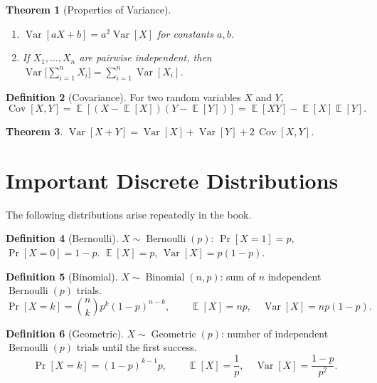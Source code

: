 \documentclass[twoside,12pt]{book}
\theoremstyle{plain}
\newtheorem{theorem}{Theorem}[chapter]
\theoremstyle{definition}
\newtheorem{definition}[theorem]{Definition}
\theoremstyle{remark}
\newcommand{\Exp}{\operatorname{\mathbb{E}}}
\newcommand{\Var}{\operatorname{Var}}
\newcommand{\Cov}{\operatorname{Cov}}
\begin{document}
\begin{theorem}[Properties of Variance]
\begin{enumerate}
\item $\Var[aX + b] = a^2 \Var[X]$ for constants $a, b$.
\item If $X_1, \ldots, X_n$ are \emph{pairwise independent}, then
      $\Var\bigl[\sum_{i=1}^{n} X_i\bigr] = \sum_{i=1}^{n} \Var[X_i]$.
\end{enumerate}
\end{theorem}

\begin{definition}[Covariance]
For two random variables $X$ and $Y$,
\[
\Cov[X, Y] = \Exp[(X - \Exp[X])(Y - \Exp[Y])]
            = \Exp[XY] - \Exp[X]\Exp[Y].
\]
\end{definition}

\begin{theorem}
$\Var[X + Y] = \Var[X] + \Var[Y] + 2\,\Cov[X, Y]$.
\end{theorem}

\section{Important Discrete Distributions}
\label{app:sec:distributions}

The following distributions arise repeatedly in the book.

\begin{definition}[Bernoulli]
$X \sim \operatorname{Bernoulli}(p)$: $\Pr[X = 1] = p$,
$\Pr[X = 0] = 1-p$. $\Exp[X] = p$, $\Var[X] = p(1-p)$.
\end{definition}

\begin{definition}[Binomial]
$X \sim \operatorname{Binomial}(n, p)$: sum of $n$ independent
$\operatorname{Bernoulli}(p)$ trials.
\[
\Pr[X = k] = \binom{n}{k} p^k (1-p)^{n-k},\qquad
\Exp[X] = np,\quad \Var[X] = np(1-p).
\]
\end{definition}

\begin{definition}[Geometric]
$X \sim \operatorname{Geometric}(p)$: number of independent
$\operatorname{Bernoulli}(p)$ trials until the first success.
\[
\Pr[X = k] = (1-p)^{k-1} p,\qquad
\Exp[X] = \frac{1}{p},\quad \Var[X] = \frac{1-p}{p^2}.
\]
\end{definition}
\end{document}
